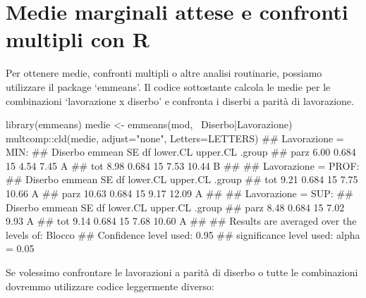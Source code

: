 \documentclass[a4paper,12pt,oneside]{book}
\newenvironment{Shaded}{}{}
\newcommand{\KeywordTok}[1]{#1}
\newcommand{\DataTypeTok}[1]{#1}
\newcommand{\StringTok}[1]{#1}
\newcommand{\CommentTok}[1]{#1}
\newcommand{\OperatorTok}[1]{#1}
\newcommand{\NormalTok}[1]{#1}
\begin{document}
\hypertarget{medie-marginali-attese-e-confronti-multipli-con-r}{%
\section{Medie marginali attese e confronti multipli con R}\label{medie-marginali-attese-e-confronti-multipli-con-r}}

Per ottenere medie, confronti multipli o altre analisi routinarie, possiamo utilizzare il package `emmeans'. Il codice sottostante calcola le medie per le combinazioni `lavorazione x diserbo' e confronta i diserbi a parità di lavorazione.

\begin{Shaded}
\begin{Highlighting}[]
\KeywordTok{library}\NormalTok{(emmeans)}
\NormalTok{medie <-}\StringTok{ }\KeywordTok{emmeans}\NormalTok{(mod, }\OperatorTok{~}\NormalTok{Diserbo}\OperatorTok{|}\NormalTok{Lavorazione)}
\NormalTok{multcomp}\OperatorTok{::}\KeywordTok{cld}\NormalTok{(medie, }\DataTypeTok{adjust=}\StringTok{"none"}\NormalTok{, }\DataTypeTok{Letters=}\NormalTok{LETTERS)}
\CommentTok{## Lavorazione = MIN:}
\CommentTok{##  Diserbo emmean    SE df lower.CL upper.CL .group}
\CommentTok{##  parz      6.00 0.684 15     4.54     7.45  A    }
\CommentTok{##  tot       8.98 0.684 15     7.53    10.44   B   }
\CommentTok{## }
\CommentTok{## Lavorazione = PROF:}
\CommentTok{##  Diserbo emmean    SE df lower.CL upper.CL .group}
\CommentTok{##  tot       9.21 0.684 15     7.75    10.66  A    }
\CommentTok{##  parz     10.63 0.684 15     9.17    12.09  A    }
\CommentTok{## }
\CommentTok{## Lavorazione = SUP:}
\CommentTok{##  Diserbo emmean    SE df lower.CL upper.CL .group}
\CommentTok{##  parz      8.48 0.684 15     7.02     9.93  A    }
\CommentTok{##  tot       9.14 0.684 15     7.68    10.60  A    }
\CommentTok{## }
\CommentTok{## Results are averaged over the levels of: Blocco }
\CommentTok{## Confidence level used: 0.95 }
\CommentTok{## significance level used: alpha = 0.05}
\end{Highlighting}
\end{Shaded}

Se volessimo confrontare le lavorazioni a parità di diserbo o tutte le combinazioni dovremmo utilizzare codice leggermente diverso:
\end{document}

